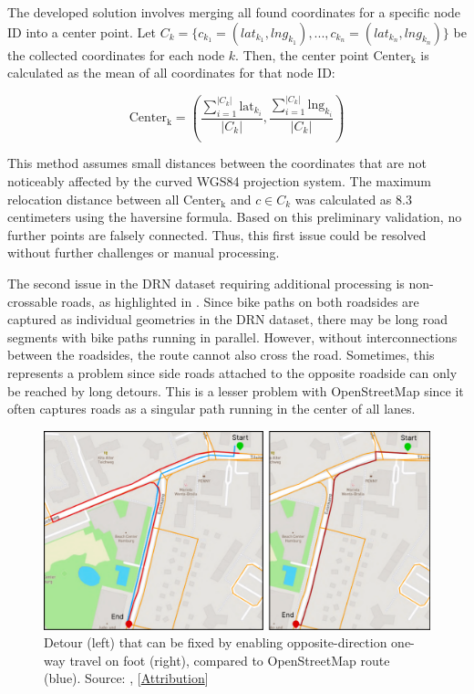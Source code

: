 The developed solution involves merging all found coordinates for a specific node ID into a center point. Let $C_k = \{c_{k_1} = (lat_{k_1}, lng_{k_1}), \text{...} , c_{k_n} = (lat_{k_n}, lng_{k_n})\}$ be the collected coordinates for each node $k$. Then, the center point $\text{Center}_{\text{k}}$ is calculated as the mean of all coordinates for that node ID:

\begin{equation}\text{Center}_{\text{k}} = \left(\frac{\sum_{i=1}^{|C_k|} \text{{lat}}_{k_i}}{|C_k|}, \frac{\sum_{i=1}^{|C_k|} \text{{lng}}_{k_i}}{|C_k|}\right)\end{equation}

This method assumes small distances between the coordinates that are not noticeably affected by the curved WGS84 projection system. The maximum relocation distance between all $\text{Center}_{\text{k}}$ and $c \in C_k$ was calculated as 8.3 centimeters using the haversine formula. Based on this preliminary validation, no further points are falsely connected. Thus, this first issue could be resolved without further challenges or manual processing.

The second issue in the DRN dataset requiring additional processing is non-crossable roads, as highlighted in . Since bike paths on both roadsides are captured as individual geometries in the DRN dataset, there may be long road segments with bike paths running in parallel. However, without interconnections between the roadsides, the route cannot also cross the road. Sometimes, this represents a problem since side roads attached to the opposite roadside can only be reached by long detours. This is a lesser problem with OpenStreetMap since it often captures roads as a singular path running in the center of all lanes.

\begin{figure}[t]
\centering
\includegraphics[width=\linewidth]{images/oneway-travel-fix.pdf}
\caption{Detour (left) that can be fixed by enabling opposite-direction one-way travel on foot (right), compared to OpenStreetMap route (blue). Source: \cite{lorenz_2022}, [\hyperref[attribution]{Attribution}]}
\label{fig:oneway-travel-fix}
\end{figure}

